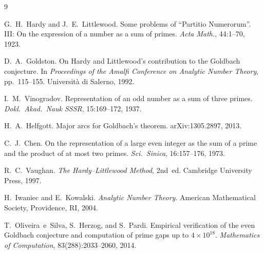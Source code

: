 \documentclass[12pt,a4paper]{amsart}
\theoremstyle{definition}
\begin{document}
\begin{thebibliography}{9}

G.~H.~Hardy and J.~E.~Littlewood.
\newblock Some problems of ``Partitio Numerorum''.  III: On the expression of
  a number as a sum of primes.
\newblock \emph{Acta Math.}, 44:1--70, 1923.

D.~A.~Goldston.
\newblock On Hardy and Littlewood's contribution to the Goldbach conjecture.
\newblock In \emph{Proceedings of the Amalfi Conference on Analytic Number
  Theory}, pp.\ 115--155.  Universit\`a di Salerno, 1992.

I.~M.~Vinogradov.
\newblock Representation of an odd number as a sum of three primes.
\newblock \emph{Dokl.\ Akad.\ Nauk SSSR}, 15:169--172, 1937.

H.~A.~Helfgott.
\newblock Major arcs for Goldbach's theorem.
\newblock arXiv:1305.2897, 2013.

C.~J.~Chen.
\newblock On the representation of a large even integer as the sum of a prime
  and the product of at most two primes.
\newblock \emph{Sci.\ Sinica}, 16:157--176, 1973.

R.~C.~Vaughan.
\newblock \emph{The Hardy--Littlewood Method}, 2nd~ed.
\newblock Cambridge University Press, 1997.

H.~Iwaniec and E.~Kowalski.
\newblock \emph{Analytic Number Theory}.
\newblock American Mathematical Society, Providence, RI, 2004.

T.~Oliveira~e~Silva, S.~Herzog, and S.~Pardi.
\newblock Empirical verification of the even Goldbach conjecture and computation
  of prime gaps up to $4 \times 10^{18}$.
\newblock \emph{Mathematics of Computation}, 83(288):2033--2060, 2014.

\end{thebibliography}
\end{document}
